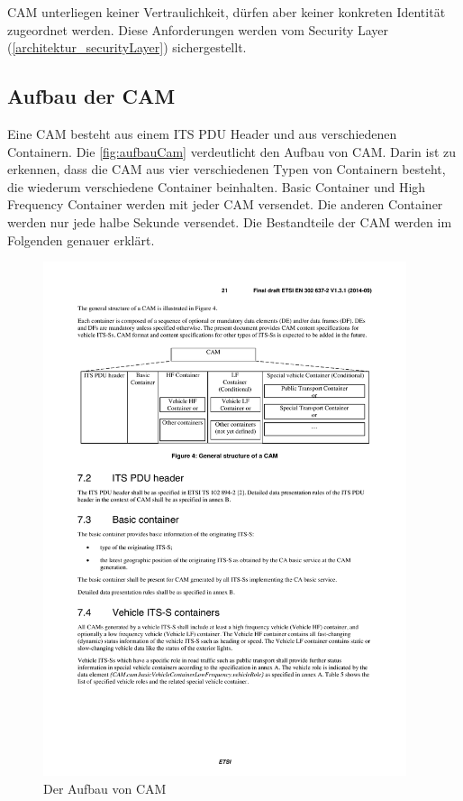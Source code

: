 \ac{CAM} unterliegen keiner Vertraulichkeit, dürfen aber keiner konkreten Identität zugeordnet werden. Diese Anforderungen werden vom Security Layer (\autoref{architektur_securityLayer}) sichergestellt. 

 
\subsection{Aufbau der CAM}
Eine \ac{CAM} besteht aus einem \ac{ITS} \ac{PDU} Header und aus verschiedenen Containern. Die \autoref{fig:aufbauCam} verdeutlicht den Aufbau von \ac{CAM}. Darin ist zu erkennen, dass die \ac{CAM} aus vier verschiedenen Typen von Containern besteht, die wiederum verschiedene Container beinhalten. Basic Container und High Frequency Container werden mit jeder \ac{CAM} versendet. Die anderen Container werden nur jede halbe Sekunde versendet. Die Bestandteile der \ac{CAM} werden im Folgenden genauer erklärt.

\begin{figure}[htbp]
	\includegraphics[width=0.95\textwidth]{content/images/04_facilitylayer/camAufbau.pdf}
	\caption{Der Aufbau von CAM \cite{en302637-2}}
	\label{fig:aufbauCam}
\end{figure}

